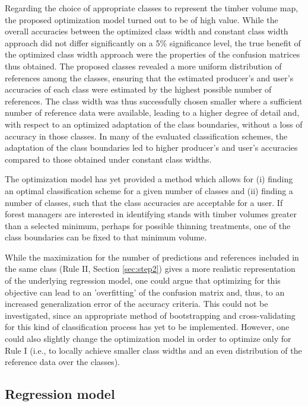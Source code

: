 Regarding the choice of appropriate classes to represent the timber volume map, the proposed optimization model turned out to be of high value. While the overall accuracies between the optimized class width and constant class width approach did not differ significantly on a 5\% significance level, the true benefit of the optimized class width approach were the properties of the confusion matrices thus obtained. The proposed classes revealed a more uniform distribution of references among the classes, ensuring that the estimated producer's and user's accuracies of each class were estimated by the highest possible number of references. The class width was thus successfully chosen smaller where a sufficient number of reference data were available, leading to a higher degree of detail and, with respect to an optimized adaptation of the class boundaries, without a loss of accuracy in those classes. In many of the evaluated classification schemes, the adaptation of the class boundaries led to higher producer's and user's accuracies compared to those obtained under constant class widths.\par
The optimization model has yet provided a method which allows for (i) finding an optimal classification scheme for a given number of classes and (ii) finding a number of classes, such that the class accuracies are acceptable for a user. If forest managers are interested in identifying stands with timber volumes greater than a selected minimum, perhaps for possible thinning treatments, one of the class boundaries can be fixed to that minimum volume.\par
While the maximization for the number of predictions and references included in the same class (Rule II, Section \ref{sec:step2}) gives a more realistic representation of the underlying regression model, one could argue that optimizing for this objective can lead to an 'overfitting' of the confusion matrix and, thus, to an increased generalization error of the accuracy criteria. This could not be investigated, since an appropriate method of bootstrapping and cross-validating for this kind of classification process has yet to be implemented. However, one could also slightly change the optimization model in order to optimize only for Rule I (i.e., to locally achieve smaller class widths and an even distribution of the reference data over the classes).

\subsection{Regression model}
\label{sec:regmod}

